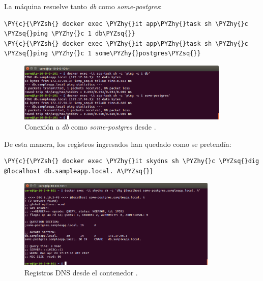 La máquina  resuelve tanto \textit{db} como \textit{some-postgres}:

\begin{framed_shaded}
\begin{Verbatim}[fontsize=\relsize{-2.5},fontseries=b,commandchars=\\\{\}]
\PY{c}{\PYZsh{} docker exec \PYZhy{}it app\PYZhy{}task sh \PYZhy{}c \PYZsq{}ping \PYZhy{}c 1 db\PYZsq{}}
\PY{c}{\PYZsh{} docker exec \PYZhy{}it app\PYZhy{}task sh \PYZhy{}c \PYZsq{}ping \PYZhy{}c 1 some\PYZhy{}postgres\PYZsq{}}
\end{Verbatim}
\end{framed_shaded}

\begin{figure}[H]
\centering
\includegraphics[width=0.9\textwidth]{images/figures/skydns-ping.png}
\caption{Conexión a \textit{db} como \textit{some-postgres} desde .}
\end{figure}

De esta manera, los registros ingresados han quedado como se pretendía:

\begin{framed_shaded}
\begin{Verbatim}[fontsize=\relsize{-2.5},fontseries=b,commandchars=\\\{\}]
\PY{c}{\PYZsh{} docker exec \PYZhy{}it skydns sh \PYZhy{}c \PYZsq{}dig @localhost db.sampleapp.local. A\PYZsq{}}
\end{Verbatim}
\end{framed_shaded}

\begin{figure}[H]
\centering
\includegraphics[width=0.85\textwidth]{images/figures/skydns-dig.png}
\caption{Registros DNS desde el contenedor .}
\end{figure}

